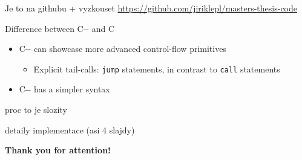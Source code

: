\documentclass[aspectratio=169]{beamer}
\newcommand{\li}[1]{\lstinline{#1}}
\begin{document}
\begin{frame}[standout]{Je to na githubu + vyzkouset}
  \url{https://github.com/jiriklepl/masters-thesis-code}
\end{frame}


\begin{frame}{Difference between C-{}- and C}
  \begin{itemize}
    \item C-{}- can showcase more advanced control-flow primitives
    \begin{itemize}
      \item Explicit tail-calls: \li{jump} statements, in contrast to \li{call} statements
    \end{itemize}
    \item C-{}- has a simpler syntax
  \end{itemize}
\end{frame}

\begin{frame}{proc to je slozity}
\end{frame}

\begin{frame}{detaily implementace (asi 4 slajdy)}
\end{frame}

\begin{frame}[plain]
\centering
{\Large\bfseries Thank you for attention!}


\end{frame}
\end{document}
